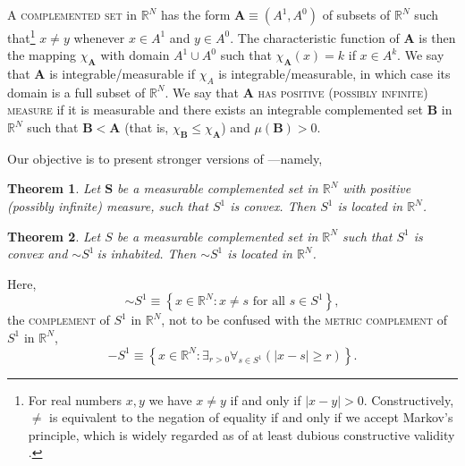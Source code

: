 \documentclass[11pt]{article}%
\newtheorem{theorem}{Theorem}
\begin{document}
A \textsc{complemented set} in $\mathbb{R}^{N}$ has the form $\mathbf{A}%
\equiv\left(  A^{1},A^{0}\right)  $ of subsets of $\mathbb{R}^{N}$ such
that\footnote{%
\normalfont\sf
For real numbers $x,y$ we have $x\neq y$ if and only if $\left\vert
x-y\right\vert >0$. Constructively, $\neq$ is equivalent to the negation of
equality if and only if we accept Markov's principle, which is widely regarded
as of at least dubious constructive validity \cite[pp. 10--11]{BVtech}.}
$x\neq y$ whenever $x\in A^{1}$ and $y\in A^{0}$. The characteristic function
of $\mathbf{A}$ is then the mapping $\chi_{\mathbf{A}}$ with domain $A^{1}\cup
A^{0}$ such that $\chi_{\mathbf{A}}(x)=k$ if $x\in A^{k}$. We say that
$\mathbf{A}$ is integrable/measurable if $\chi_{A}$ is integrable/measurable,
in which case its domain is a full subset of $\mathbb{R}^{N}$. We say that
$\mathbf{A}$ \textsc{has positive (possibly infinite) measure} if it is
measurable and there exists an integrable complemented set $\mathbf{B}$ in
$\mathbb{R}^{N}$ such that $\mathbf{B}<\mathbf{A}$ (that is, $\chi
_{\mathbf{B}}\leqslant\chi_{\mathbf{A}}$) and $\mu(\mathbf{B})>0$.

Our objective is to present stronger versions of \cite[Thms 2 and 4]{Br88}---namely,

\begin{theorem}
\label{jul21t1}Let $\mathbf{S}$ be a measurable complemented set in
$\mathbb{R}^{N}$ with positive (possibly infinite) measure, such that $S^{1}$
is convex. Then $S^{1}$ is located in $\mathbb{R}^{N}$.
\end{theorem}

\begin{theorem}
\label{jul21t2}Let \textbf{$S$} be a measurable complemented set in
$\mathbb{R}^{N}$\emph{ }such that $S^{1}$ is convex and $%
\mathord{\sim}%
S^{1}\ $is inhabited. Then $%
\mathord{\sim}%
S^{1}$ is located in $\mathbb{R}^{N}$.
\end{theorem}

%

\noindent
Here,%
\[%
\mathord{\sim}%
S^{1}\equiv\left\{  x\in\mathbb{R}^{N}:x\neq s\text{ for all }s\in
S^{1}\right\}  ,
\]
the \textsc{complement} of $S^{1}$ in $\mathbb{R}^{N}$, not to be confused
with the \textsc{metric complement }of $S^{1}$ in $\mathbb{R}^{N}$,%
\[
-S^{1}\equiv\left\{  x\in\mathbb{R}^{N}:\exists_{r>0}\forall_{s\in S^{1}%
}\left(  \left\vert x-s\right\vert \geq r\right)  \right\}  .
\]
%
\end{document}
